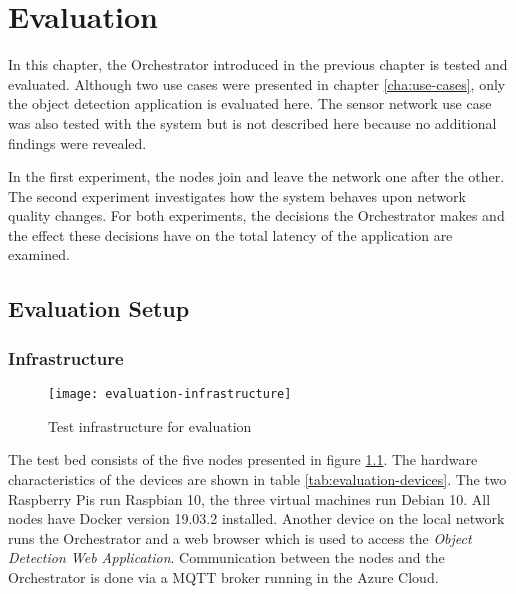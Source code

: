 \chapter{Evaluation\label{cha:evaluation}}

In this chapter, the Orchestrator introduced in the previous chapter is tested and evaluated.
Although two use cases were presented in chapter \ref{cha:use-cases}, only the object detection application is evaluated here.
The sensor network use case was also tested with the system but is not described here because no additional findings were revealed.

In the first experiment, the nodes join and leave the network one after the other.
The second experiment investigates how the system behaves upon network quality changes.
For both experiments, the decisions the Orchestrator makes and the effect these decisions have on the total latency of the application are examined.




\section{Evaluation Setup}

\subsection{Infrastructure\label{sec:eval-infrastructure}}

\begin{figure}[htb]
    \centering
    \texttt{[image: evaluation-infrastructure]}
    \caption{Test infrastructure for evaluation}
    \label{fig:evaluation-infrastructure}
\end{figure}

The test bed consists of the five nodes presented in figure \ref{fig:evaluation-infrastructure}. The hardware characteristics of the devices are shown in table \ref{tab:evaluation-devices}. The two Raspberry Pis run Raspbian 10, the three virtual machines run Debian 10. All nodes have Docker version 19.03.2 installed. Another device on the local network runs the Orchestrator and a web browser which is used to access the \textit{Object Detection Web Application}. Communication between the nodes and the Orchestrator is done via a MQTT broker running in the Azure Cloud.

